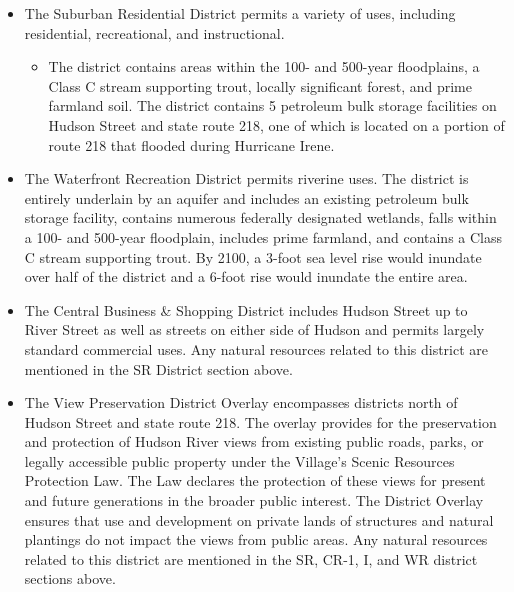 \begin{itemize}
\begin{itemize}
        \end{itemize}
    \item The Suburban Residential District permits a variety of uses, including residential, recreational, and instructional.
    \begin{itemize}
        \item The district contains areas within the 100- and 500-year floodplains, a Class C stream supporting trout, locally significant forest, and prime farmland soil. The district contains 5 petroleum bulk storage facilities on Hudson Street and state route 218, one of which is located on a portion of route 218 that flooded during Hurricane Irene.
        \end{itemize}
    \item The Waterfront Recreation District permits riverine uses. The district is entirely underlain by an aquifer and includes an existing petroleum bulk storage facility, contains numerous federally designated wetlands, falls within a 100- and 500-year floodplain, includes prime farmland, and contains a Class C stream supporting trout. By 2100, a 3-foot sea level rise would inundate over half of the district and a 6-foot rise would inundate the entire area.
   \item The Central Business \& Shopping District includes Hudson Street up to River Street as well as streets on either side of Hudson and permits largely standard commercial uses. Any natural resources related to this district are mentioned in the SR District section above.
    \item The View Preservation District Overlay encompasses districts north of Hudson Street and state route 218. The overlay provides for the preservation and protection of Hudson River views from existing public roads, parks, or legally accessible public property under the Village’s Scenic Resources Protection Law. The Law declares the protection of these views for present and future generations in the broader public interest. The District Overlay ensures that use and development on private lands of structures and natural plantings do not impact the views from public areas. Any natural resources related to this district are mentioned in the SR, CR-1, I, and WR district sections above.
\end{itemize}